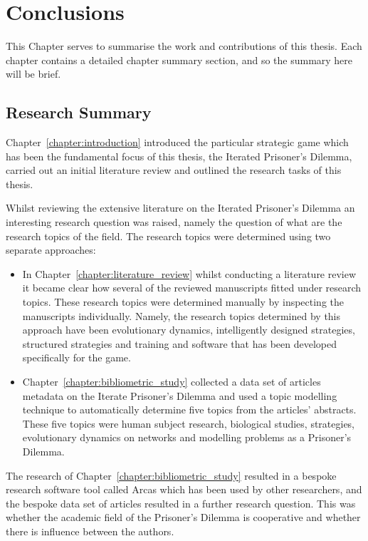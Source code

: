 \chapter{Conclusions}\label{chapter:conclusion}

This Chapter serves to summarise the work and contributions of this thesis. Each
chapter contains a detailed chapter summary section, and so the summary here will be
brief.

\section{Research Summary}

Chapter~\ref{chapter:introduction} introduced the particular strategic game
which has been the fundamental focus of this thesis, the Iterated Prisoner's
Dilemma, carried out an initial literature review and outlined the research
tasks of this thesis.

Whilst reviewing the extensive literature on the Iterated Prisoner's Dilemma an
interesting research question was raised, namely the question of what are the
research topics of the field. The research topics were determined using two
separate approaches:

\begin{itemize}
    \item In Chapter~\ref{chapter:literature_review} whilst conducting a
    literature review it became clear how several of the reviewed
    manuscripts fitted under research topics. These research topics were
    determined manually by inspecting the manuscripts individually. Namely, the
    research topics determined by this approach have been evolutionary dynamics,
    intelligently designed strategies, structured strategies and training and
    software that has been developed specifically for the game.
    \item Chapter~\ref{chapter:bibliometric_study} collected a data set of articles
    metadata on the Iterate Prisoner's Dilemma and used a topic modelling technique
    to automatically determine five topics from the articles' abstracts.
    These five topics were human
    subject research, biological studies, strategies, evolutionary dynamics on
    networks and modelling problems as a Prisoner's Dilemma.
\end{itemize}

The research of Chapter~\ref{chapter:bibliometric_study} resulted in a bespoke
research software tool called Arcas which has been used by other researchers,
and the bespoke data set of articles resulted in a further research question.
This was whether the academic field of the Prisoner’s Dilemma is cooperative and
whether there is influence between the authors.

